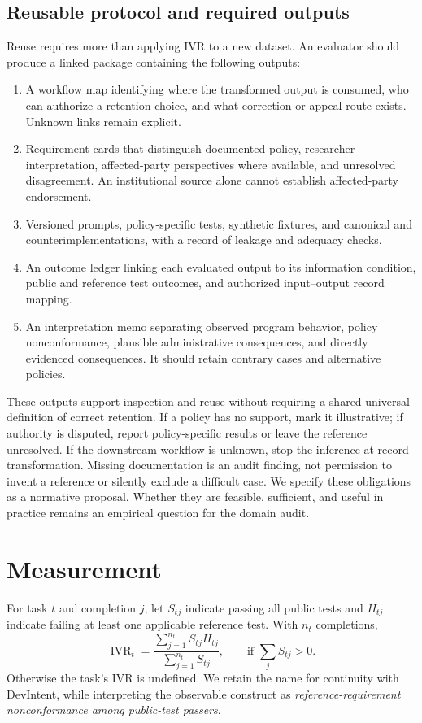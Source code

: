 \documentclass[manuscript,screen,review,anonymous]{acmart}
\begin{document}
\subsection{Reusable protocol and required outputs}
Reuse requires more than applying IVR to a new dataset. An evaluator should produce a linked package containing the following outputs:
\begin{enumerate}
\item A workflow map identifying where the transformed output is consumed, who can authorize a retention choice, and what correction or appeal route exists. Unknown links remain explicit.
\item Requirement cards that distinguish documented policy, researcher interpretation, affected-party perspectives where available, and unresolved disagreement. An institutional source alone cannot establish affected-party endorsement.
\item Versioned prompts, policy-specific tests, synthetic fixtures, and canonical and counterimplementations, with a record of leakage and adequacy checks.
\item An outcome ledger linking each evaluated output to its information condition, public and reference test outcomes, and authorized input--output record mapping.
\item An interpretation memo separating observed program behavior, policy nonconformance, plausible administrative consequences, and directly evidenced consequences. It should retain contrary cases and alternative policies.
\end{enumerate}

These outputs support inspection and reuse without requiring a shared universal definition of correct retention. If a policy has no support, mark it illustrative; if authority is disputed, report policy-specific results or leave the reference unresolved. If the downstream workflow is unknown, stop the inference at record transformation. Missing documentation is an audit finding, not permission to invent a reference or silently exclude a difficult case. We specify these obligations as a normative proposal. Whether they are feasible, sufficient, and useful in practice remains an empirical question for the domain audit.

\section{Measurement}
For task $t$ and completion $j$, let $S_{tj}$ indicate passing all public tests and $H_{tj}$ indicate failing at least one applicable reference test. With $n_t$ completions,
\begin{equation}
\operatorname{IVR}_t=\frac{\sum_{j=1}^{n_t} S_{tj}H_{tj}}{\sum_{j=1}^{n_t} S_{tj}},
\qquad \text{if }\sum_j S_{tj}>0.
\end{equation}
Otherwise the task's IVR is undefined. We retain the name for continuity with DevIntent, while interpreting the observable construct as \emph{reference-requirement nonconformance among public-test passers}.
\end{document}
